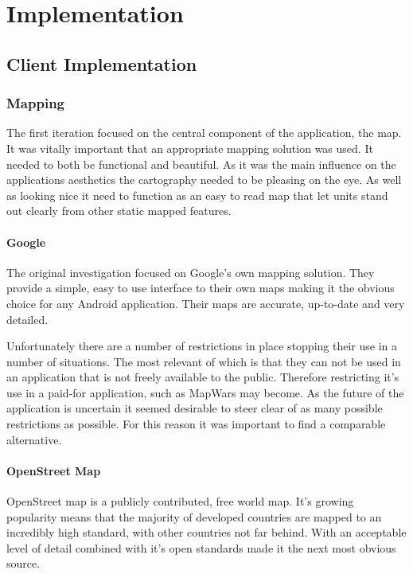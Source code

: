 \chapter{Implementation}

\section{Client Implementation}
\subsection{Mapping}
The first iteration focused on the central component of the application, the map. It was vitally important that an appropriate mapping solution was used. It needed to both be functional and beautiful. As it was the main influence on the applications aesthetics the cartography needed to be pleasing on the eye. As well as looking nice it need to function as an easy to read map that let units stand out clearly from other static mapped features.

\subsubsection*{Google}
The original investigation focused on Google's own mapping solution. They provide a simple, easy to use interface to their own maps making it the obvious choice for any Android application. Their maps are accurate, up-to-date and very detailed.

Unfortunately there are a number of restrictions in place stopping their use in a number of situations. The most relevant of which is that they can not be used in an application that is not freely available to the public. Therefore restricting it's use in a paid-for application, such as MapWars may become. As the future of the application is uncertain it seemed desirable to steer clear of as many possible restrictions as possible. For this reason it was important to find a comparable alternative.

\subsubsection*{OpenStreet Map}
OpenStreet map is a publicly contributed, free world map. It's growing popularity means that the majority of developed countries are mapped to an incredibly high standard, with other countries not far behind. With an acceptable level of detail combined with it's open standards made it the next most obvious source.

